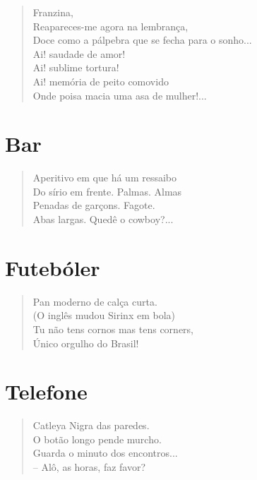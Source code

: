 \begin{verse}
Franzina,\\
Reapareces-me agora na lembrança,\\
Doce como a pálpebra que se fecha para o sonho...\\
Ai! saudade de amor!\\
Ai! sublime tortura!\\
Ai! memória de peito comovido\\
Onde poisa macia uma asa de mulher!...
\end{verse}


\section{Bar}

\begin{verse}
Aperitivo em que há um ressaibo\\
Do sírio em frente. Palmas. Almas\\
Penadas de garçons. Fagote.\\
Abas largas. Quedê o cowboy?...
\end{verse}

\medskip
\section{Futebóler}

\begin{verse}
Pan moderno de calça curta.\\
(O inglês mudou Sirinx em bola)\\
Tu não tens cornos mas tens corners,\\
Único orgulho do Brasil!
\end{verse}

\medskip
\section{Telefone}

\begin{verse}
Catleya Nigra das paredes.\\
O botão longo pende murcho.\\
Guarda o minuto dos encontros...\\
-- Alô, as horas, faz favor?
\end{verse}


